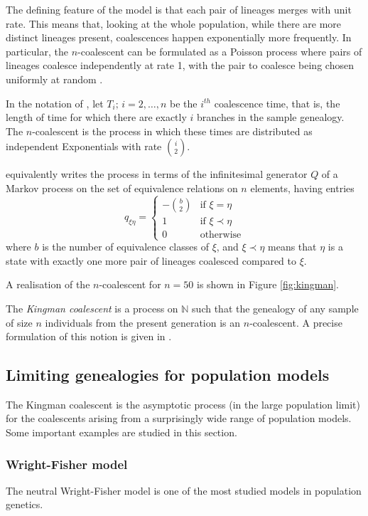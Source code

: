 \documentclass[fleqn]{article}
\theoremstyle{definition}
\begin{document}
The defining feature of the model is that each pair of lineages merges with unit rate. This means that, looking at the whole population, while there are more distinct lineages present, coalescences happen exponentially more frequently.
In particular, the $n$-coalescent can be formulated as a Poisson process where pairs of lineages coalesce independently at rate 1, with the pair to coalesce being chosen uniformly at random \citep[Section 3.2]{wakeley2009}.

In the notation of \citet{wakeley2009}, let $T_i;\, i=2,\dots,n$ be the $i^{th}$ coalescence time, that is, the length of time for which there are exactly $i$ branches in the sample genealogy. The $n$-coalescent is the process in which these times are distributed as independent Exponentials with rate $\binom{i}{2}$.

\citet{mohle1998} equivalently writes the process in terms of the infinitesimal generator $Q$ of a Markov process on the set of equivalence relations on $n$ elements, having entries
\begin{equation*}
q_{\xi\eta} =
\begin{cases}
-\binom{b}{2} &\text{if }\xi=\eta \\
1 & \text{if }\xi \prec\eta \\
0 & \text{otherwise}
\end{cases}
\end{equation*}
where $b$ is the number of equivalence classes of $\xi$, and $\xi \prec \eta$ means that $\eta$ is a state with exactly one more pair of lineages coalesced compared to $\xi$.

A realisation of the $n$-coalescent for $n=50$ is shown in Figure \ref{fig:kingman}.
 
The \emph{Kingman coalescent} is a process on $\mathbb{N}$ such that the genealogy of any sample of size $n$ individuals from the present generation is an $n$-coalescent.
A precise formulation of this notion is given in \citep{wakeley2009}.

\subsection{Limiting genealogies for population models}
The Kingman coalescent is the asymptotic process (in the large population limit) for the coalescents arising from a surprisingly wide range of population models. Some important examples are studied in this section.

\subsubsection{Wright-Fisher model}
The neutral Wright-Fisher model \citep{fisher1923, fisher1930, wright1931} is one of the most studied models in population genetics.
\end{document}
